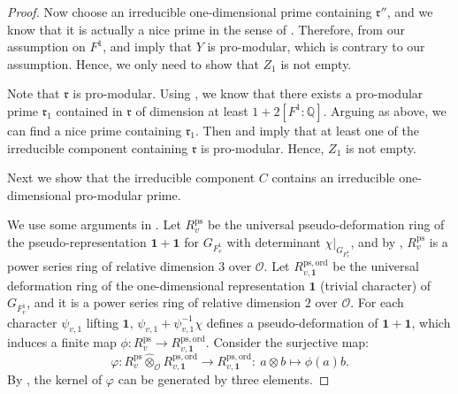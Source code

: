 \documentclass[a4paper, 12pt]{amsart}
\def\ps{\mathrm{ps}}
\def\ord{\mathrm{ord}}
\newcommand{\cO}{\mathcal{O}}
\begin{document}
\begin{proof}
    	Now choose an irreducible one-dimensional prime containing $\mathfrak{r}''$, and we know that it is actually a nice prime in the sense of \cite[Definition 4.1.3]{Zhang:2024aa}. Therefore, from our assumption on $F^1$, \cite[Proposition 3.1.5]{Zhang:2024ab} and \cite[Theorem 4.1.1]{Zhang:2024aa} imply that $Y$ is pro-modular, which is contrary to our assumption. Hence, we only need to show that $Z_1$ is not empty.
    	
    	Note that $\mathfrak{r}$ is pro-modular. Using \cite[Corollary 3.3.10]{Zhang:2024aa}, we know that there exists a pro-modular prime $\mathfrak{r}_1$ contained in $\mathfrak{r}$ of dimension at least $1+2[F^1: \mathbb{Q}]$. Arguing as above, we can find a nice prime containing $\mathfrak{r}_1$. Then \cite[Proposition 3.1.5]{Zhang:2024ab} and \cite[Theorem 4.1.1]{Zhang:2024aa} imply that  at least one of the irreducible component containing $\mathfrak{r}$ is pro-modular. Hence, $Z_1$ is not empty.
    	
    	Next we show that the irreducible component $C$ contains an irreducible one-dimensional pro-modular prime. 
    	
    	We use some arguments in \cite[Subsection 7.3]{pan2022fontaine}. Let $R^{\ps}_v $ be the universal pseudo-deformation ring of the pseudo-representation $\mathbf{1}+\mathbf{1}$ for $G_{F^1_v}$ with determinant $\chi|_{G_{F^1_v}}$, and by \cite[Corollary 9.1.3]{Pa_k_nas_2013}, $R^{\ps}_v $ is a power series ring of relative dimension $3$ over $\cO$. Let $R_{v, \mathbf{1}}^{\ps,\ord}$ be the universal deformation ring of the one-dimensional representation $\mathbf{1}$ (trivial character) of $G_{F^1_v}$, and it is a power series ring of relative dimension $2$ over $\cO$. For each character $\psi_{v,1}$ lifting $\mathbf{1}$, $\psi_{v,1}+\psi_{v,1}^{-1}\chi$ defines a pseudo-deformation of $\mathbf{1}+\mathbf{1}$, which induces a finite map $\phi: R_v^\ps \to R_{v, \mathbf{1}}^{\ps,\ord}$. Consider the surjective map:
    	\[\varphi: R^{\ps}_v\hat{\otimes}_{\cO} R^{\ps,\ord}_{v,\mathbf{1}}\to R^{\ps,\ord}_{v,\mathbf{1}}:~a\otimes b\mapsto \phi(a)b.\]
    	  By \cite[Lemma 10.106.4]{stacks-project}, the kernel of $\varphi$ can be generated by three elements.
    	

\end{proof}
\end{document}
